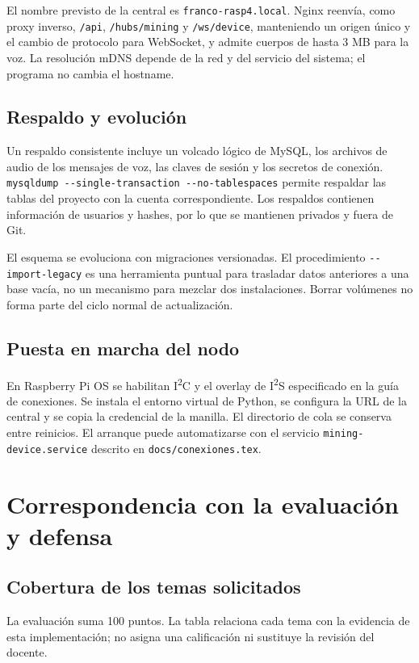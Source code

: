 \documentclass[10pt,a4paper]{article}
\newcommand{\code}[1]{{\small\urlstyle{tt}\nolinkurl{#1}}}
\newcommand{\newsection}[1]{\clearpage\section{#1}}
\begin{document}
El nombre previsto de la central es \code{franco-rasp4.local}. Nginx reenvía, como proxy inverso, \code{/api}, \code{/hubs/mining} y \code{/ws/device}, manteniendo un origen único y el cambio de protocolo para WebSocket, y admite cuerpos de hasta 3 MB para la voz. La resolución mDNS depende de la red y del servicio del sistema; el programa no cambia el hostname.

\subsection{Respaldo y evolución}
Un respaldo consistente incluye un volcado lógico de MySQL, los archivos de audio de los mensajes de voz, las claves de sesión y los secretos de conexión. \code{mysqldump --single-transaction --no-tablespaces} permite respaldar las tablas del proyecto con la cuenta correspondiente. Los respaldos contienen información de usuarios y hashes, por lo que se mantienen privados y fuera de Git.

El esquema se evoluciona con migraciones versionadas. El procedimiento \code{--import-legacy} es una herramienta puntual para trasladar datos anteriores a una base vacía, no un mecanismo para mezclar dos instalaciones. Borrar volúmenes no forma parte del ciclo normal de actualización.

\subsection{Puesta en marcha del nodo}
En Raspberry Pi OS se habilitan I\textsuperscript{2}C y el overlay de I\textsuperscript{2}S especificado en la guía de conexiones. Se instala el entorno virtual de Python, se configura la URL de la central y se copia la credencial de la manilla. El directorio de cola se conserva entre reinicios. El arranque puede automatizarse con el servicio \code{mining-device.service} descrito en \code{docs/conexiones.tex}.


\newsection{Correspondencia con la evaluación y defensa}
\label{sec:evaluacion}
\subsection{Cobertura de los temas solicitados}
La evaluación suma 100 puntos. La tabla relaciona cada tema con la evidencia de esta implementación; no asigna una calificación ni sustituye la revisión del docente.
\end{document}
